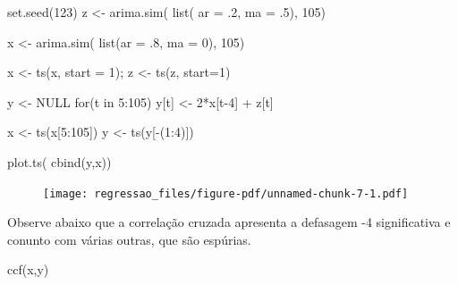 \documentclass[
  letterpaper,
  DIV=11,
  numbers=noendperiod]{scrartcl}
\newenvironment{Shaded}{\begin{snugshade}}{\end{snugshade}}
\newcommand{\AttributeTok}[1]{\textcolor[rgb]{0.40,0.45,0.13}{#1}}
\newcommand{\ConstantTok}[1]{\textcolor[rgb]{0.56,0.35,0.01}{#1}}
\newcommand{\ControlFlowTok}[1]{\textcolor[rgb]{0.00,0.23,0.31}{#1}}
\newcommand{\DecValTok}[1]{\textcolor[rgb]{0.68,0.00,0.00}{#1}}
\newcommand{\FunctionTok}[1]{\textcolor[rgb]{0.28,0.35,0.67}{#1}}
\newcommand{\NormalTok}[1]{\textcolor[rgb]{0.00,0.23,0.31}{#1}}
\newcommand{\OtherTok}[1]{\textcolor[rgb]{0.00,0.23,0.31}{#1}}
\newcommand{\SpecialCharTok}[1]{\textcolor[rgb]{0.37,0.37,0.37}{#1}}
\theoremstyle{plain}
\theoremstyle{plain}
\theoremstyle{definition}
\theoremstyle{definition}
\theoremstyle{remark}
\begin{document}
\begin{Shaded}
\begin{Highlighting}[]
\FunctionTok{set.seed}\NormalTok{(}\DecValTok{123}\NormalTok{)}
\NormalTok{z }\OtherTok{\textless{}{-}} \FunctionTok{arima.sim}\NormalTok{( }\FunctionTok{list}\NormalTok{( }\AttributeTok{ar =}\NormalTok{ .}\DecValTok{2}\NormalTok{, }\AttributeTok{ma =}\NormalTok{ .}\DecValTok{5}\NormalTok{), }\DecValTok{105}\NormalTok{)}

\NormalTok{x }\OtherTok{\textless{}{-}} \FunctionTok{arima.sim}\NormalTok{( }\FunctionTok{list}\NormalTok{(}\AttributeTok{ar =}\NormalTok{ .}\DecValTok{8}\NormalTok{, }\AttributeTok{ma =} \DecValTok{0}\NormalTok{), }\DecValTok{105}\NormalTok{)}

\NormalTok{x }\OtherTok{\textless{}{-}} \FunctionTok{ts}\NormalTok{(x, }\AttributeTok{start =} \DecValTok{1}\NormalTok{); z }\OtherTok{\textless{}{-}} \FunctionTok{ts}\NormalTok{(z, }\AttributeTok{start=}\DecValTok{1}\NormalTok{)}

\NormalTok{y }\OtherTok{\textless{}{-}} \ConstantTok{NULL}
\ControlFlowTok{for}\NormalTok{(t }\ControlFlowTok{in} \DecValTok{5}\SpecialCharTok{:}\DecValTok{105}\NormalTok{) y[t] }\OtherTok{\textless{}{-}} \DecValTok{2}\SpecialCharTok{*}\NormalTok{x[t}\DecValTok{{-}4}\NormalTok{] }\SpecialCharTok{+}\NormalTok{ z[t]}

\NormalTok{x }\OtherTok{\textless{}{-}} \FunctionTok{ts}\NormalTok{(x[}\DecValTok{5}\SpecialCharTok{:}\DecValTok{105}\NormalTok{])}
\NormalTok{y }\OtherTok{\textless{}{-}} \FunctionTok{ts}\NormalTok{(y[}\SpecialCharTok{{-}}\NormalTok{(}\DecValTok{1}\SpecialCharTok{:}\DecValTok{4}\NormalTok{)])}

\FunctionTok{plot.ts}\NormalTok{( }\FunctionTok{cbind}\NormalTok{(y,x))}
\end{Highlighting}
\end{Shaded}

\begin{figure}[H]

{\centering \texttt{[image: regressao\_files/figure-pdf/unnamed-chunk-7-1.pdf]}

}

\end{figure}

Observe abaixo que a correlação cruzada apresenta a defasagem -4
significativa e conunto com várias outras, que são espúrias.

\begin{Shaded}
\begin{Highlighting}[]
\FunctionTok{ccf}\NormalTok{(x,y)}
\end{Highlighting}
\end{Shaded}
\end{document}
